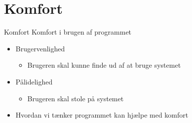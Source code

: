\section{Komfort}
\begin{frame}{Komfort}{}
Komfort i brugen af programmet
\begin{itemize}
\item Brugervenlighed
\begin{itemize}
\item Brugeren skal kunne finde ud af at bruge systemet
\end{itemize}
\item Pålidelighed
\begin{itemize}
\item Brugeren skal stole på systemet
\end{itemize}
\item Hvordan vi tænker programmet kan hjælpe med komfort
\end{itemize}
\end{frame}